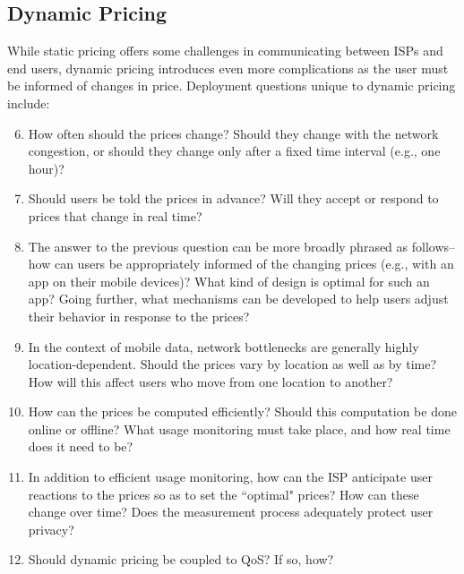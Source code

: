 \subsection{Dynamic Pricing}
While static pricing offers some challenges in communicating between ISPs and end users, dynamic pricing introduces even more complications as the user must be informed of changes in price. Deployment questions unique to dynamic pricing include:
\begin{enumerate}
\setcounter{enumi}{5}
\item
How often should the prices change? Should they change with the network congestion, or should they change only after a fixed time interval (e.g., one hour)?
\item
Should users be told the prices in advance? Will they accept or respond to prices that change in real time?
\item
The answer to the previous question can be more broadly phrased as follows--how can users be appropriately informed of the changing prices (e.g., with an app on their mobile devices)? What kind of design is optimal for such an app? Going further, what mechanisms can be developed to help users adjust their behavior in response to the prices?
\item
In the context of mobile data, network bottlenecks are generally highly location-dependent. Should the prices vary by location as well as by time? How will this affect users who move from one location to another?
\item
How can the prices be computed efficiently? Should this computation be done online or offline? What usage monitoring must take place, and how real time does it need to be?
\item
In addition to efficient usage monitoring, how can the ISP anticipate user reactions to the prices so as to set the ``optimal" prices? How can these change over time? Does the measurement process adequately protect user privacy?
\item
Should dynamic pricing be coupled to QoS? If so, how?
\end{enumerate}

